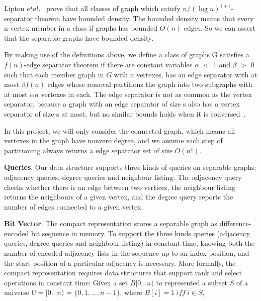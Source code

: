 \documentclass[12pt,glossary]{dalthesis}
\begin{document}
\bigskip
\bigskip

Lipton $et al$.~\cite{Nested-Dissection} prove that all classes of graph which satisfy $n/(\log n )^{1+\epsilon}$-separator theorem have bounded density. The bounded density means that every n-vertex member in a class if graphs has bounded $O(n)$ edges. So we can assert that the separable graphs have bounded density.

\bigskip
\bigskip

By making use of the definitions above, we define a class of graphs G satisfies a $f(n)$-edge separator theorem if there are constant variables $\alpha$ $<$ 1 and $\beta$ $>$ 0 such that each member graph in $G$ with n vertexes, has an edge separator with at most $\beta f(n)$ edges whose removal partitions the graph into two subgraphs with at most $\alpha n$ vertexes in each. The edge separator is not as common as the vertex separator, because a graph with an edge separator of size s also has a vertex separator of size s at most, but no similar bounds holds when it is conversed~\cite{compact-representation}.

\bigskip
\bigskip

In this project, we will only consider the connected graph, which means all vertexes in the graph have nonzero degree, and we assume each step of partitioning always returns a edge separator set of size $O(n^{c})$.

\bigskip
\bigskip

\textbf{Queries}. Our data structure supports three kinds of queries on separable graphs: adjacency queries, degree queries and neighbour listing. The adjacency query checks whether there is an edge between two vertices, the neighbour listing returns the neighbours of a given vertex, and the degree query reports the number of edges connected to a given vertex.

\bigskip
\bigskip

\textbf{Bit Vector}. The compact representation stores a separable graph as difference-encoded bit sequence in memory. To support the three kinds queries (adjacency queries, degree queries and neighbour listing) in constant time, knowing both the number of encoded adjacency lists in the sequence up to an index position, and the start position of a particular adjacency is necessary. More formally, the compact representation requires data structures that support rank and select operations in constant time: Given a set $B[0...n)$ to represented a subset $S$ of a universe $U = [0...n)$ = $\{0,1,...,n-1 \}$, where $B[i] = 1 \ iff \ i \in S$,
\end{document}
